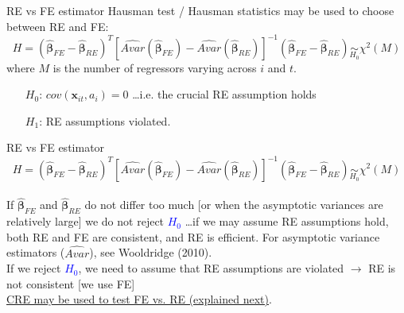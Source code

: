 \documentclass[usenames,dvipsnames]{beamer}
\begin{document}
\begin{frame}{RE vs FE estimator}
Hausman test / Hausman statistics may be used to choose between RE and FE: \\
$$H=(\hat{\bm{\beta}}_{FE} - \hat{\bm{\beta}}_{RE})^T [\widehat{\textit{Avar}}(\hat{\bm{\beta}}_{FE}) - \widehat{\textit{Avar}}(\hat{\bm{\beta}}_{RE})]^{-1} (\hat{\bm{\beta}}_{FE} - \hat{\bm{\beta}}_{RE}) \underset{H_0}{\sim} \chi^2(M)$$
{\footnotesize where $M$ is the number of regressors varying across $i$ and $t$.}
\bigskip
\begin{itemize}
\item[$H_0$:] $\textit{cov}(\bm{x}_{it},a_i) = 0$ \dots i.e. the crucial RE assumption holds
\item[$H_1$:] RE assumptions violated.
\end{itemize}
\end{frame}
\begin{frame}{RE vs FE estimator}
\
{\small $$H=(\hat{\bm{\beta}}_{FE} - \hat{\bm{\beta}}_{RE})^T [\widehat{\textit{Avar}}(\hat{\bm{\beta}}_{FE}) - \widehat{\textit{Avar}}(\hat{\bm{\beta}}_{RE})]^{-1} (\hat{\bm{\beta}}_{FE} - \hat{\bm{\beta}}_{RE}) \underset{H_0}{\sim} \chi^2(M)$$}\\
\bigskip
If $\hat{\bm{\beta}}_{FE}$ and $\hat{\bm{\beta}}_{RE}$ do not differ too much [or when the asymptotic variances are relatively large] we do not reject \textcolor{Blue}{$H_0$} \dots if we may assume RE assumptions hold, both RE and FE are consistent, and RE is efficient. For asymptotic variance estimators ($\widehat{\textit{Avar}}$), see Wooldridge (2010).\\ 
\bigskip
If we reject \textcolor{Blue}{$H_0$}, we need to assume that RE assumptions are violated $\rightarrow$ RE is not consistent [we use FE] \\
\underline{CRE may be used to test FE vs. RE (explained next)}.
\end{frame}
\end{document}
